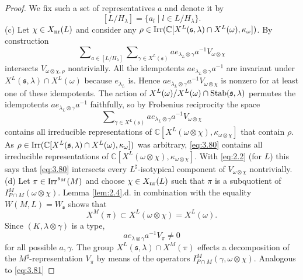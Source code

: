\documentclass[11pt]{amsart}
\theoremstyle{definition}
\begin{document}
\begin{proof}
We fix such a set of representatives $a$ and denote it by 
\begin{equation}\label{eq:3.64}
[L / H_\lambda] = \{ a_l \mid l \in L / H_\lambda \} .
\end{equation}
(c) Let $\chi \in X_{{\rm nr}} (L)$ and consider any $\rho \in {{\rm Irr}} ({\mathbb C}[X^L ({{\mathfrak s}},\lambda) 
\cap X^L (\omega), \kappa_\omega])$. By construction 
\begin{equation}\label{eq:3.80}
\sum\nolimits_{a \in [L / H_\lambda]} \sum\nolimits_{\gamma \in X^L ({{\mathfrak s}})}
a e_{\lambda_L \otimes \gamma} a^{-1} V_{\omega \otimes \chi}
\end{equation}
intersects $V_{\omega \otimes \chi,\rho}$ nontrivially. All the
idempotents $a e_{\lambda_L \otimes \gamma} a^{-1}$ are invariant under 
$X^L ({{\mathfrak s}},\lambda) \cap X^L (\omega)$ because $e_{\lambda_L}$ is. Hence 
$a e_{\lambda_L \otimes \gamma} a^{-1} V_{\omega \otimes \chi}$ is nonzero
for at least one of these idempotents. The action of $X^L (\omega) /
X^L (\omega) \cap {{\rm Stab}} ({{\mathfrak s}},\lambda)$ permutes the idempotents 
$a e_{\lambda_L \otimes \gamma} a^{-1}$ faithfully, so by Frobenius reciprocity
the space 
\[
\sum\nolimits_{\gamma \in X^L ({{\mathfrak s}})} a e_{\lambda_L \otimes \gamma} a^{-1} 
V_{\omega \otimes \chi}
\]
contains all irreducible representations of 
${\mathbb C} [X^L (\omega \otimes \chi),\kappa_{\omega \otimes \chi}]$ that contain $\rho$.
As $\rho \in {{\rm Irr}} ({\mathbb C}[X^L ({{\mathfrak s}},\lambda) \cap X^L (\omega), \kappa_\omega])$ was
arbitrary, \eqref{eq:3.80} contains all irreducible representations of
${\mathbb C} [X^L (\omega \otimes \chi),\kappa_{\omega \otimes \chi}]$. With \eqref{eq:2.2}
(for $L$) this says that \eqref{eq:3.80} intersects every $L^\sharp$-isotypical
component of $V_{\omega \otimes \chi}$ nontrivially.\\
(d) Let $\pi \in {{\rm Irr}}^{{{\mathfrak s}}_M}(M)$ and choose $\chi \in X_{{\rm nr}} (L)$ such that $\pi$
is a subquotient of $I_{P \cap M}^M (\omega \otimes \chi)$. 
Lemma \ref{lem:2.4}.d. in combination with the equality $W (M,L) = W_{{\mathfrak s}}$ shows that 
\[
X^M (\pi) \subset X^L (\omega \otimes \chi) = X^L (\omega) .
\] 
Since $(K,\lambda \otimes \gamma)$ is a type, 
\[
a e_{\lambda \otimes \gamma} a^{-1} V_\pi \neq 0
\]
for all possible $a,\gamma$. The group $X^L ({{\mathfrak s}},\lambda) \cap X^M (\pi)$ 
effects a decomposition of the $M^\sharp$-representation $V_\pi$ by means of the 
operators $I_{P \cap M}^M (\gamma, \omega \otimes \chi)$. Analogous to \eqref{eq:3.81}

\end{proof}
\end{document}
